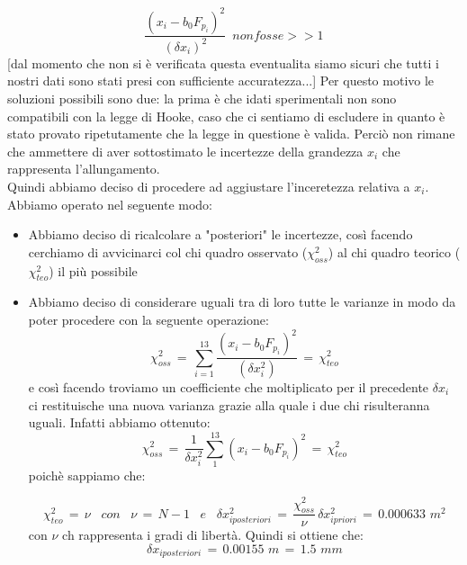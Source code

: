 \begin{equation*}
	\frac{(x_i - b_0 F_{p_i})^2}{(\delta x_i)^2} \,\,\, non fosse >> 1
\end{equation*}
[dal momento che non si è verificata questa eventualita siamo sicuri che tutti i nostri dati sono stati presi con sufficiente accuratezza...]
Per questo motivo le soluzioni possibili sono due: la prima è che idati sperimentali non sono compatibili con la legge di Hooke, caso che ci sentiamo di escludere in quanto è stato provato ripetutamente che la legge in questione è valida. Perciò non rimane che ammettere di aver sottostimato le incertezze della grandezza $x_i$ che rappresenta l'allungamento.\\
Quindi abbiamo deciso di procedere ad aggiustare l'inceretezza relativa a $x_i$. Abbiamo operato nel seguente modo:
\begin{itemize}
\item{Abbiamo deciso di ricalcolare a "posteriori" le incertezze, così facendo cerchiamo di avvicinarci col chi quadro osservato ($\chi_{oss}^2$) al chi quadro teorico ($\chi_{teo}^2$) il più possibile}
\item{Abbiamo deciso di considerare uguali tra di loro tutte le varianze in modo da poter procedere con la seguente operazione:
	\begin{equation*}
		\chi_{oss}^2 \,=\, \sum_{i=1}^{13} \frac{(x_i - b_0 F_{p_i})^2}{(\delta x_i^2)} \,=\, \chi_{teo}^2 
	\end{equation*}
	e così facendo troviamo un coefficiente che moltiplicato per il precedente $\delta x_i$ ci restituische una nuova varianza grazie alla quale i due chi risulteranna uguali. Infatti abbiamo ottenuto:
	\begin{equation*}
		\chi_{oss}^2 \,=\, \frac{1}{\delta x_{i}^2} \sum_{1}^{13} (x_i - b_0 F_{p_i})^2  \,=\, \chi_{teo}^2
	\end{equation*}
	poichè sappiamo che:
	
	\begin{equation*}
		\chi_{teo}^2 \,=\, \nu \,\,\,\,\, con \,\,\,\,\,
		\nu \,=\, N - 1 \,\,\,\,\, e \,\,\,\,\,
		\delta x_{iposteriori}^2 \,=\, \frac{\chi_{oss}^2}{\nu} \, \delta x_{ipriori}^2 \,=\, 0.000633 \,\, m^2
	\end{equation*}
	con $\nu$ ch rappresenta i gradi di libertà.
	Quindi si ottiene che:
	\begin{equation*}
		\delta x_{iposteriori} \,=\, 0.00155 \,\, m \,=\, 1.5 \,\, mm
	\end{equation*}}	 
\end{itemize}
